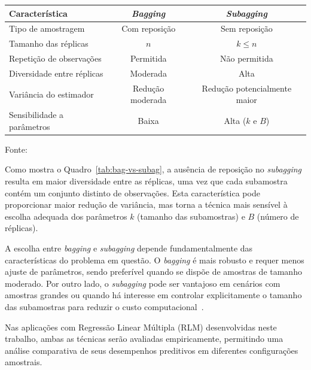 \begin{quadro}[ht]
\centering
\caption{Características comparativas entre \textit{bagging} e \textit{subagging}.}
\label{tab:bag-vs-subag}
\begin{tabular}{|l|c|c|}
\hline %
\textbf{Característica} & \textbf{\textit{Bagging}} & \textbf{\textit{Subagging}} \\
\hline %
Tipo de amostragem & Com reposição & Sem reposição \\
Tamanho das réplicas & $n$ & $k \leq n$ \\
Repetição de observações & Permitida & Não permitida \\
Diversidade entre réplicas & Moderada & Alta \\
Variância do estimador & Redução moderada & Redução potencialmente maior \\
Sensibilidade a parâmetros & Baixa & Alta ($k$ e $B$) \\
\hline %
\end{tabular}
\par\vspace{3pt}
{\footnotesize Fonte: \oautor}
\end{quadro}


Como mostra o Quadro~\ref{tab:bag-vs-subag}, a ausência de reposição no \textit{subagging} resulta em maior diversidade entre as réplicas, uma vez que cada subamostra contém um conjunto distinto de observações. Esta característica pode proporcionar maior redução de variância, mas torna a técnica mais sensível à escolha adequada dos parâmetros $k$ (tamanho das subamostras) e $B$ (número de réplicas).


A escolha entre \textit{bagging} e \textit{subagging} depende fundamentalmente das características do problema em questão. O \textit{bagging} é mais robusto e requer menos ajuste de parâmetros, sendo preferível quando se dispõe de amostras de tamanho moderado. Por outro lado, o \textit{subagging} pode ser vantajoso em cenários com amostras grandes ou quando há interesse em controlar explicitamente o tamanho das subamostras para reduzir o custo computacional~\cite{Buhlmann2003}.

Nas aplicações com Regressão Linear Múltipla (RLM) desenvolvidas neste trabalho, ambas as técnicas serão avaliadas empiricamente, permitindo uma análise comparativa de seus desempenhos preditivos em diferentes configurações amostrais.

